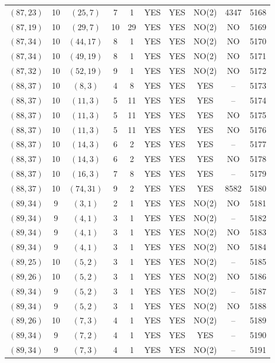 \begin{longtable}{|c|c|c|c|c|c|c|c|c|c|}
$(87, 23)$ & 10 & $(25, 7)$ & 7 & 1 & YES & YES & NO(2) & 4347 & 5168\\
$(87, 19)$ & 10 & $(29, 7)$ & 10 & 29 & YES & YES & NO(2) & NO & 5169\\
$(87, 34)$ & 10 & $(44, 17)$ & 8 & 1 & YES & YES & NO(2) & NO & 5170\\
$(87, 34)$ & 10 & $(49, 19)$ & 8 & 1 & YES & YES & NO(2) & NO & 5171\\
$(87, 32)$ & 10 & $(52, 19)$ & 9 & 1 & YES & YES & NO(2) & NO & 5172\\
$(88, 37)$ & 10 & $(8, 3)$ & 4 & 8 & YES & YES & YES & -- & 5173\\
$(88, 37)$ & 10 & $(11, 3)$ & 5 & 11 & YES & YES & YES & -- & 5174\\
$(88, 37)$ & 10 & $(11, 3)$ & 5 & 11 & YES & YES & YES & NO & 5175\\
$(88, 37)$ & 10 & $(11, 3)$ & 5 & 11 & YES & YES & YES & NO & 5176\\
$(88, 37)$ & 10 & $(14, 3)$ & 6 & 2 & YES & YES & YES & -- & 5177\\
$(88, 37)$ & 10 & $(14, 3)$ & 6 & 2 & YES & YES & YES & NO & 5178\\
$(88, 37)$ & 10 & $(16, 3)$ & 7 & 8 & YES & YES & YES & -- & 5179\\
$(88, 37)$ & 10 & $(74, 31)$ & 9 & 2 & YES & YES & YES & 8582 & 5180\\
$(89, 34)$ & 9 & $(3, 1)$ & 2 & 1 & YES & YES & NO(2) & NO & 5181\\
$(89, 34)$ & 9 & $(4, 1)$ & 3 & 1 & YES & YES & NO(2) & -- & 5182\\
$(89, 34)$ & 9 & $(4, 1)$ & 3 & 1 & YES & YES & NO(2) & NO & 5183\\
$(89, 34)$ & 9 & $(4, 1)$ & 3 & 1 & YES & YES & NO(2) & NO & 5184\\
$(89, 25)$ & 10 & $(5, 2)$ & 3 & 1 & YES & YES & NO(2) & -- & 5185\\
$(89, 26)$ & 10 & $(5, 2)$ & 3 & 1 & YES & YES & NO(2) & NO & 5186\\
$(89, 34)$ & 9 & $(5, 2)$ & 3 & 1 & YES & YES & NO(2) & -- & 5187\\
$(89, 34)$ & 9 & $(5, 2)$ & 3 & 1 & YES & YES & NO(2) & NO & 5188\\
$(89, 26)$ & 10 & $(7, 3)$ & 4 & 1 & YES & YES & NO(2) & -- & 5189\\
$(89, 34)$ & 9 & $(7, 2)$ & 4 & 1 & YES & YES & YES & -- & 5190\\
$(89, 34)$ & 9 & $(7, 3)$ & 4 & 1 & YES & YES & NO(2) & -- & 5191\\

\end{longtable}
